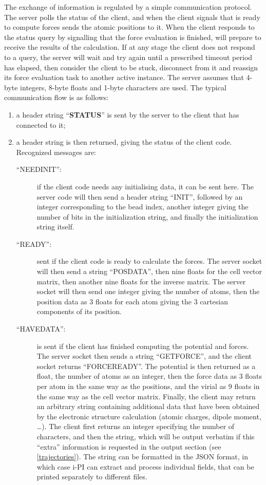 \documentclass[11pt,english,fleqn]{report}
\begin{document}
The exchange of information is regulated by a simple
communication protocol. The server polls the status of the client,
and when the client signals that is ready to compute forces
\ipi sends the atomic positions to it. When the client responds to the
status query by signalling that the force evaluation is finished,
\ipi will prepare to receive the results of the calculation.
 If at any stage the client does not respond to a query, the server
will wait and try again until a prescribed timeout period has elapsed,
then consider the client to be stuck, disconnect from it
and reassign its force evaluation task to another active instance.
The server assumes that 4-byte integers, 8-byte floats
and 1-byte characters are used. The typical communication flow is
as follows:
%
\begin{enumerate}
\item a header string {}``\textbf{STATUS}'' is sent by the server to
the client that has connected to it;
\item a header string is then returned, giving the status of the client
code. Recognized messages are:
\begin{description}
\item [{{}``NEEDINIT'':}] if the client code needs any initialising data,
it can be sent here. The server code will then send a header string
{}``INIT'', followed by an integer corresponding to the bead index,
another integer giving the number of bits in
the initialization string, and finally the initialization string itself.
\item [{{}``READY'':}] sent if the client code is ready to calculate
the forces. The server socket will then send a string {}``POSDATA'',
then nine floats for the cell vector matrix, then another nine floats
for the inverse matrix. The server socket will then send one
integer giving the number of atoms, then the position data as 3 floats
for each atom giving the 3 cartesian components of its position.
\item [{{}``HAVEDATA'':}] is sent if the client has finished computing the
potential and forces. The server socket then sends a string {}``GETFORCE'',
and the client socket returns {}``FORCEREADY''. The potential is
then returned as a float, the number of atoms as an integer, then
the force data as 3 floats per atom in the same way as the positions,
and the virial as 9 floats in the same way as the cell vector matrix.
Finally, the client may return an arbitrary string containing additional
data that have been obtained by the electronic structure calculation
(atomic charges, dipole moment, \ldots). The client first returns
an integer specifying the number of characters, and then the string,
which will be output verbatim if this ``extra'' information is
requested in the output section (see \ref{trajectories}).
The string can be formatted in the JSON format, in which case i-PI
can extract and process individual fields, that can be printed separately
to different files.


\end{description}
\end{enumerate}
\end{document}
